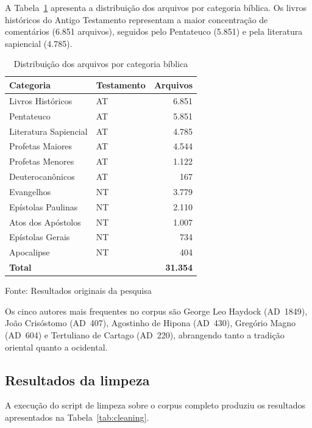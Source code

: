 \documentclass[11pt,a4paper]{article}
\begin{document}
A Tabela~\ref{tab:coverage} apresenta a distribui\c{c}\~{a}o dos arquivos por categoria b\'{i}blica. Os livros hist\'{o}ricos do Antigo Testamento representam a maior concentra\c{c}\~{a}o de coment\'{a}rios (6.851 arquivos), seguidos pelo Pentateuco (5.851) e pela literatura sapiencial (4.785).

\begin{table}[H]
\centering
\caption{Distribui\c{c}\~{a}o dos arquivos por categoria b\'{i}blica}
\label{tab:coverage}
\begin{tabularx}{0.75\textwidth}{Xlr}
\toprule
Categoria & Testamento & Arquivos \\
\midrule
Livros Hist\'{o}ricos & AT & 6.851 \\
Pentateuco & AT & 5.851 \\
Literatura Sapiencial & AT & 4.785 \\
Profetas Maiores & AT & 4.544 \\
Profetas Menores & AT & 1.122 \\
Deuterocan\^{o}nicos & AT & 167 \\
Evangelhos & NT & 3.779 \\
Ep\'{i}stolas Paulinas & NT & 2.110 \\
Atos dos Ap\'{o}stolos & NT & 1.007 \\
Ep\'{i}stolas Gerais & NT & 734 \\
Apocalipse & NT & 404 \\
\midrule
\textbf{Total} & & \textbf{31.354} \\
\bottomrule
\end{tabularx}

Fonte: Resultados originais da pesquisa
\end{table}

Os cinco autores mais frequentes no corpus s\~{a}o George Leo Haydock (AD~1849), Jo\~{a}o Cris\'{o}stomo (AD~407), Agostinho de Hipona (AD~430), Greg\'{o}rio Magno (AD~604) e Tertuliano de Cartago (AD~220), abrangendo tanto a tradi\c{c}\~{a}o oriental quanto a ocidental.

\subsection{Resultados da limpeza}

A execu\c{c}\~{a}o do script de limpeza sobre o corpus completo produziu os resultados apresentados na Tabela~\ref{tab:cleaning}.
\end{document}
